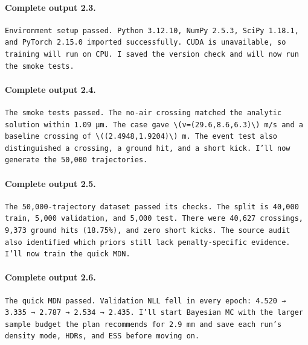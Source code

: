\documentclass[UTF8,10pt]{ctexart}
\begin{document}
\paragraph{Complete output 2.3.}
\begin{Verbatim}[breaklines=true,breakanywhere=true,fontsize=\scriptsize,frame=single,framesep=2pt]
Environment setup passed. Python 3.12.10, NumPy 2.5.3, SciPy 1.18.1, and PyTorch 2.15.0 imported successfully. CUDA is unavailable, so training will run on CPU. I saved the version check and will now run the smoke tests.
\end{Verbatim}

\paragraph{Complete output 2.4.}
\begin{Verbatim}[breaklines=true,breakanywhere=true,fontsize=\scriptsize,frame=single,framesep=2pt]
The smoke tests passed. The no-air crossing matched the analytic solution within 1.09 µm. The case gave \(v=(29.6,8.6,6.3)\) m/s and a baseline crossing of \((2.4948,1.9204)\) m. The event test also distinguished a crossing, a ground hit, and a short kick. I’ll now generate the 50,000 trajectories.
\end{Verbatim}

\paragraph{Complete output 2.5.}
\begin{Verbatim}[breaklines=true,breakanywhere=true,fontsize=\scriptsize,frame=single,framesep=2pt]
The 50,000-trajectory dataset passed its checks. The split is 40,000 train, 5,000 validation, and 5,000 test. There were 40,627 crossings, 9,373 ground hits (18.75%), and zero short kicks. The source audit also identified which priors still lack penalty-specific evidence. I’ll now train the quick MDN.
\end{Verbatim}

\paragraph{Complete output 2.6.}
\begin{Verbatim}[breaklines=true,breakanywhere=true,fontsize=\scriptsize,frame=single,framesep=2pt]
The quick MDN passed. Validation NLL fell in every epoch: 4.520 → 3.335 → 2.787 → 2.534 → 2.435. I’ll start Bayesian MC with the larger sample budget the plan recommends for 2.9 mm and save each run’s density mode, HDRs, and ESS before moving on.
\end{Verbatim}
\end{document}
